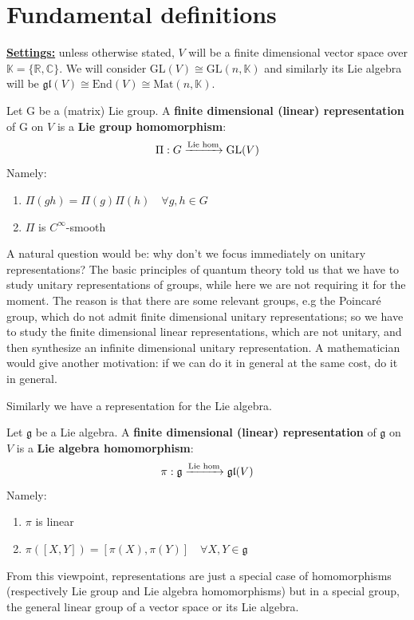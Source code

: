 \documentclass[../main.tex]{subfiles}
\begin{document}
\section{Fundamental definitions}
\underline{\textbf{Settings:}} unless otherwise stated, $V$ will be a finite dimensional vector space over $\mathbb{K}=\{\mathbb{R},\mathbb{C}\}$. We will consider GL$(V)\cong\textrm{GL}(n,\mathbb{K})$ and similarly its Lie algebra will be $\mathfrak{gl}(V)\cong\textrm{End}(V)\cong\textrm{Mat}(n,\mathbb{K})$.
\begin{definition}[Representation]
Let G be a (matrix) Lie group. A \textbf{finite dimensional (linear) representation} of G on $V$ is a \textbf{Lie group homomorphism}:
\[
\Pi:G\xrightarrow[]{{\color{black}\text{Lie hom}}}\text{GL}(V)
\]
Namely:
\begin{enumerate}
    \item $\Pi(gh)=\Pi(g)\Pi(h) \quad \forall g,h\in G$
    \item $\Pi$ is $C^{\infty}$-smooth
\end{enumerate}
\end{definition}
A natural question would be: why don't we focus immediately on unitary representations? The basic principles of quantum theory told us that we have to study unitary representations of groups, while here we are not requiring it for the moment. The reason is that there are some relevant groups, e.g the Poincaré group, which do not admit finite dimensional unitary representations; so we have to study the finite dimensional linear representations, which are not unitary, and then synthesize an infinite dimensional unitary representation. A mathematician would give another motivation: if we can do it in general at the same cost, do it in general.

Similarly we have a representation for the Lie algebra.
\begin{definition}
Let $\mathfrak{g}$ be a Lie algebra. A \textbf{finite dimensional (linear) representation} of $\mathfrak{g}$ on $V$ is a \textbf{Lie algebra homomorphism}:
\[
\pi:\mathfrak{g}\xrightarrow[]{{\color{black}\text{Lie hom}}}\mathfrak{gl}(V)
\]
Namely:
\begin{enumerate}
    \item $\pi$ is linear
    \item $\pi([X,Y])=[\pi(X),\pi(Y)] \quad \forall X,Y\in\mathfrak{g}$
\end{enumerate}
\end{definition}
From this viewpoint, representations are just a special case of homomorphisms (respectively Lie group and Lie algebra homomorphisms) but in a special group, the general linear group of a vector space or its Lie algebra. 
\end{document}
